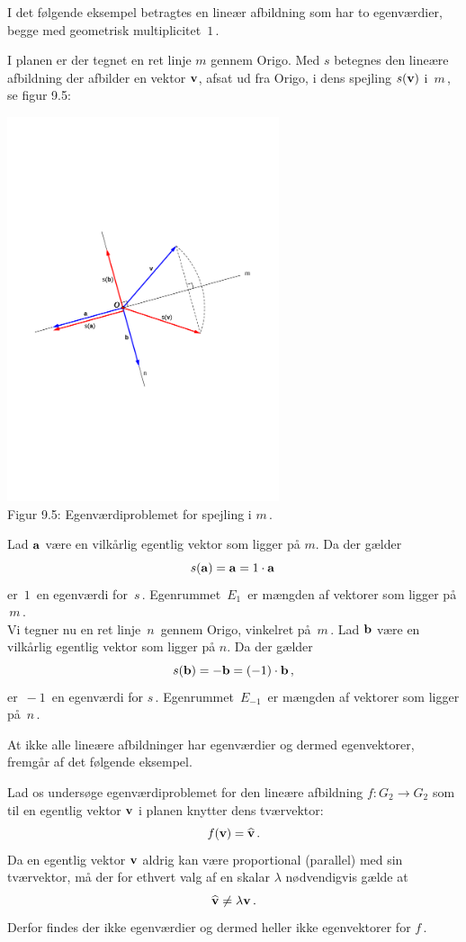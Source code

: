 I det følgende eksempel betragtes en lineær afbildning som har to egenværdier, begge med geometrisk multiplicitet $\,1\,$. 
\begin{example}\label{spejling}
I planen er der tegnet en ret linje $m$ gennem Origo. Med $s$ betegnes den lineære afbildning der afbilder en vektor $\mathbf{v}$, afsat ud fra Origo, i dens spejling $s(\mathbf{v})$ i $\,m\,$, se figur 9.5:
\begin{center}
		\includegraphics[trim=2cm 9.2cm 2cm
 9cm,width=0.6\textwidth,clip]{evSpejling.pdf}
  \\Figur 9.5: Egenværdiproblemet for spejling i $m\,$. 
\end{center}
Lad $\mathbf{a}$ være en vilkårlig egentlig vektor som ligger på $m$. Da der gælder $$s(\mathbf{a})=\mathbf{a}=1\cdot \mathbf{a}\,$$ er $\,1\,$ en egenværdi for $\,s\,$. Egenrummet $\,E_1\,$ er mængden af vektorer som ligger på $\,m\,$.\\

Vi tegner nu en ret linje $\,n\,$ gennem Origo, vinkelret på $\,m\,$. Lad $\mathbf{b}$ være en vilkårlig egentlig vektor som ligger på $n$. Da der gælder $$s(\mathbf{b})=-\mathbf{b}=(-1)\cdot \mathbf{b}\,,$$ er $\,-1\,$ en egenværdi for $s\,$. Egenrummet $\,E_{-1}\,$ er mængden af vektorer som ligger på $\,n\,$.
\end{example}

At ikke alle lineære afbildninger har egenværdier og dermed egenvektorer, fremgår af det følgende eksempel.

\begin{example}\label{hatvektor}
Lad os undersøge egenværdiproblemet for den lineære afbildning $f:G_2\rightarrow G_2$ som til en egentlig vektor $\mathbf{v}$ i planen knytter dens tværvektor:
$$f(\mathbf{v})=\widehat{\mathbf{v}}\,.$$
Da en egentlig vektor $\mathbf{v}$ aldrig kan være proportional (parallel) med sin tværvektor, må der for ethvert valg af en skalar $\lambda$ nødvendigvis gælde at
$$\widehat{\mathbf{v}}\neq \lambda \mathbf{v}\,.$$
Derfor findes der ikke egenværdier og dermed heller ikke egenvektorer for $f\,$.
\end{example}


